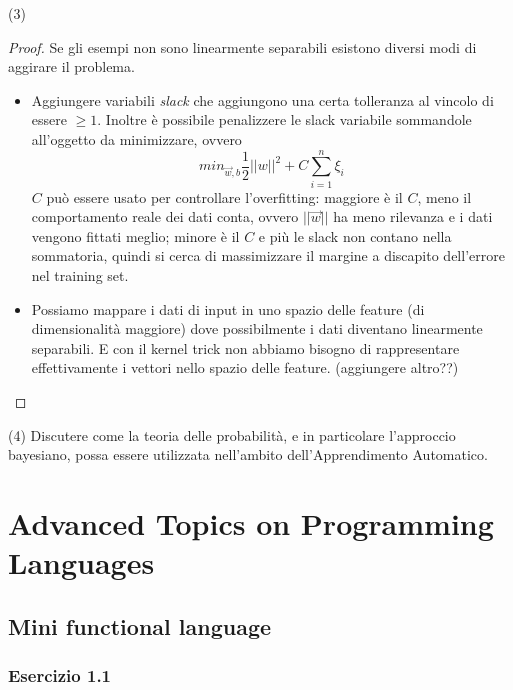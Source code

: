 \documentclass[12pt,a4paper,oneside]{book}
\begin{document}
\begin{exercise}{(3)}
\begin{proof}
   		Se gli esempi non sono linearmente separabili esistono diversi modi di aggirare il problema.
   		\begin{itemize}
   			\item Aggiungere variabili \emph{slack} che aggiungono una certa tolleranza al vincolo di essere $\geq 1$. Inoltre è possibile penalizzere le slack variabile sommandole all'oggetto da minimizzare, ovvero
   			\[
   				min_{\vec{w},b} \frac{1}{2} ||w||^2 + C \sum_{i=1}^{n} \xi_i
   			\]
   			$C$ può essere usato per controllare l'overfitting: maggiore è il $C$, meno il comportamento reale dei dati conta, ovvero $||\vec{w}||$ ha meno rilevanza e i dati vengono fittati meglio; minore è il $C$ e più le slack non contano nella sommatoria, quindi si cerca di massimizzare il margine a discapito dell'errore nel training set.
   			
   			\item Possiamo mappare i dati di input in uno spazio delle feature (di dimensionalità maggiore) dove possibilmente i dati diventano linearmente separabili.
   			E con il kernel trick non abbiamo bisogno di rappresentare effettivamente i vettori nello spazio delle feature.
   			(aggiungere altro??)
   		\end{itemize}
    \end{proof}
\end{exercise}

\begin{exercise}{(4)}
    Discutere come la teoria delle probabilità, e in particolare
    l'approccio bayesiano, possa essere utilizzata nell'ambito
    dell'Apprendimento Automatico.
\end{exercise}

\chapter{Advanced Topics on Programming Languages}

\section{Mini functional language}

\subsection{Esercizio 1.1}
\end{document}
